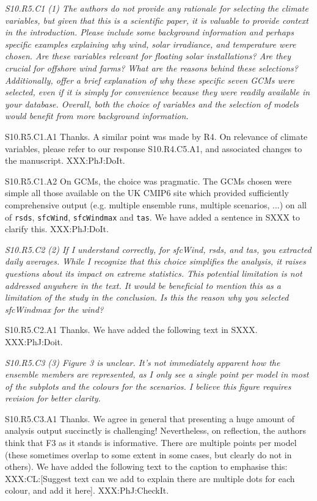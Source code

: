 \documentclass[a4paper,10pt]{article}
\providecommand{\RS}{\texttt{rsds}\xspace}
\providecommand{\WS}{\texttt{sfcWind}\xspace}
\providecommand{\WM}{\texttt{sfcWindmax}\xspace}
\providecommand{\TA}{\texttt{tas}\xspace}
\begin{document}
	\emph{S10.R5.C1 (1) The authors do not provide any rationale for selecting the climate variables, but given that this is a scientific paper, it is valuable to provide context in the introduction. Please include some background information and perhaps specific examples explaining why wind, solar irradiance, and temperature were chosen. Are these variables relevant for floating solar installations? Are they crucial for offshore wind farms? What are the reasons behind these selections? Additionally, offer a brief explanation of why these specific seven GCMs were selected, even if it is simply for convenience because they were readily available in your database. Overall, both the choice of variables and the selection of models would benefit from more background information.}

	S10.R5.C1.A1 Thanks. A similar point was made by R4. On relevance of climate variables, please refer to our response S10.R4.C5.A1, and associated changes to the manuscript. XXX:PhJ:DoIt.
	
	S10.R5.C1.A2 On GCMs, the choice was pragmatic. The GCMs chosen were simple all those available on the UK CMIP6 site which provided sufficiently comprehensive output (e.g. multiple ensemble runs, multiple scenarios, ...) on all of \RS, \WS, \WM and \TA. We have added a sentence in SXXX to clarify this. XXX:PhJ:DoIt.  

	\emph{S10.R5.C2 (2) If I understand correctly, for sfcWind, rsds, and tas, you extracted daily averages. While I recognize that this choice simplifies the analysis, it raises questions about its impact on extreme statistics. This potential limitation is not addressed anywhere in the text. It would be beneficial to mention this as a limitation of the study in the conclusion. Is this the reason why you selected sfcWindmax for the wind?}

	S10.R5.C2.A1 Thanks. We have added the following text in SXXX. XXX:PhJ:Doit.

	\emph{S10.R5.C3 (3) Figure 3 is unclear. It's not immediately apparent how the ensemble members are represented, as I only see a single point per model in most of the subplots and the colours for the scenarios. I believe this figure requires revision for better clarity.}

	S10.R5.C3.A1 Thanks. We agree in general that presenting a huge amount of analysis output succinctly is challenging! Nevertheless, on reflection, the authors think that F3 as it stands is informative. There are multiple points per model (these sometimes overlap to some extent in some cases, but clearly do not in others). We have added the following text to the caption to emphasise this: XXX:CL:[Suggest text can we add to explain there are multiple dots for each colour, and add it here]. XXX:PhJ:CheckIt.
\end{document}
